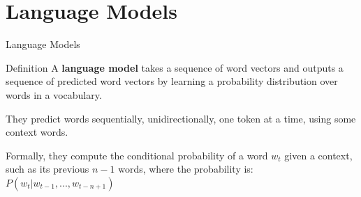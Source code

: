 
\section{Language Models}




\begin{frame}{Language Models}
    
    \begin{definitionBlock}{Definition}
    A \alert{\textbf{language model}} takes a sequence of word vectors and outputs a sequence of predicted word vectors by learning a probability distribution over words in a vocabulary.
    
    They predict words sequentially, unidirectionally, one token at a time, using some context words. 
    
    Formally, they compute the conditional probability of a word $w_t$ given a context, such as its previous $n-1$ words, where the probability is: $P(w_t | w_{t-1}, ..., w_{t-n+1})$
    
    \end{definitionBlock}
    
    
\end{frame}





